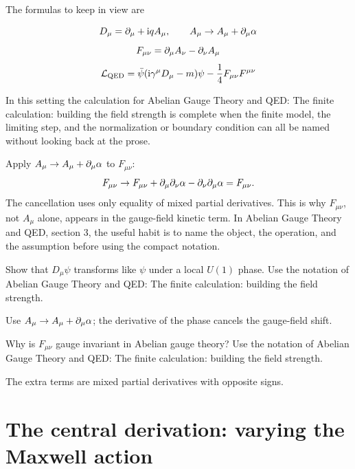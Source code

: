 The formulas to keep in view are

\[
  D_\mu=\partial_\mu+\mathrm i qA_\mu,\qquad A_\mu\to A_\mu+\partial_\mu\alpha
\]
\[
  F_{\mu\nu}=\partial_\mu A_\nu-\partial_\nu A_\mu
\]
\[
  \mathcal L_{\mathrm{QED}}=\bar\psi(\mathrm i\gamma^\mu D_\mu-m)\psi-\frac14F_{\mu\nu}F^{\mu\nu}
\]

In this setting the calculation for Abelian Gauge Theory and QED: The finite calculation: building the field strength is complete when the finite model, the limiting step, and the normalization or boundary condition can all be named without looking back at the prose.




\begin{example}
Apply \(A_\mu\to A_\mu+\partial_\mu\alpha\) to \(F_{\mu\nu}\):
\[
  F_{\mu\nu}\to F_{\mu\nu}+\partial_\mu\partial_\nu\alpha-\partial_\nu\partial_\mu\alpha=F_{\mu\nu}.
\]
The cancellation uses only equality of mixed partial derivatives.  This is why \(F_{\mu\nu}\), not \(A_\mu\) alone, appears in the gauge-field kinetic term.  In Abelian Gauge Theory and QED, section 3, the useful habit is to name the object, the operation, and the assumption before using the compact notation.
\end{example}



\begin{exercise}
Show that \(D_\mu\psi\) transforms like \(\psi\) under a local \(U(1)\) phase.  Use the notation of Abelian Gauge Theory and QED: The finite calculation: building the field strength.
\begin{answer}
Use \(A_\mu\to A_\mu+\partial_\mu\alpha\); the derivative of the phase cancels the gauge-field shift.
\end{answer}
\end{exercise}

\begin{exercise}
Why is \(F_{\mu\nu}\) gauge invariant in Abelian gauge theory?  Use the notation of Abelian Gauge Theory and QED: The finite calculation: building the field strength.
\begin{answer}
The extra terms are mixed partial derivatives with opposite signs.
\end{answer}
\end{exercise}



\section{The central derivation: varying the Maxwell action}


